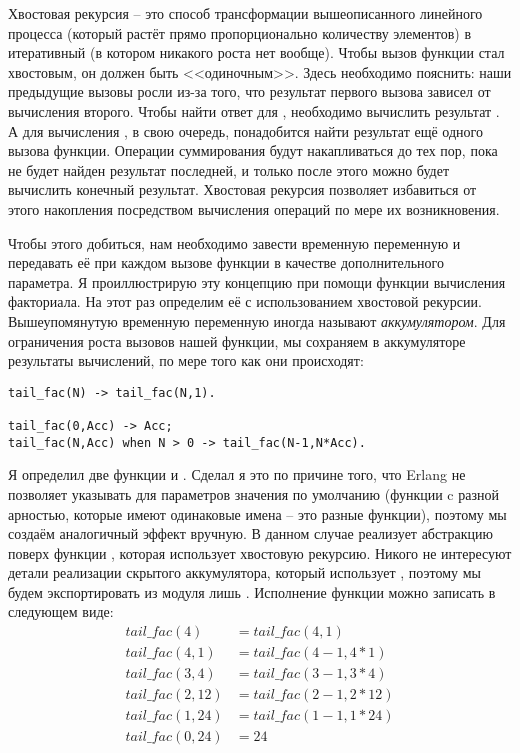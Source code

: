Хвостовая рекурсия \--- это способ трансформации вышеописанного линейного процесса (который растёт прямо пропорционально количеству элементов) в итеративный (в котором никакого роста нет вообще). Чтобы вызов функции стал хвостовым, он должен быть <<одиночным>>. Здесь необходимо пояснить: наши предыдущие вызовы росли из\--за того, что результат первого вызова зависел от вычисления второго. Чтобы найти ответ для , необходимо вычислить результат . А для вычисления , в свою очередь, понадобится найти результат ещё одного вызова функции. Операции суммирования будут накапливаться до тех пор, пока не будет найден результат последней, и только после этого можно будет вычислить конечный результат. Хвостовая рекурсия позволяет избавиться от этого накопления посредством вычисления операций по мере их возникновения.

Чтобы этого добиться, нам необходимо завести временную переменную и передавать её при каждом вызове функции в качестве дополнительного параметра. Я проиллюстрирую эту концепцию при помощи функции вычисления факториала. На этот раз определим её с использованием хвостовой рекурсии. Вышеупомянутую временную переменную иногда называют \emph{аккумулятором}. Для ограничения роста вызовов нашей функции, мы сохраняем в аккумуляторе результаты вычислений, по мере того как они происходят:
\begin{lstlisting}[style=erlang]
tail_fac(N) -> tail_fac(N,1).
 
tail_fac(0,Acc) -> Acc;
tail_fac(N,Acc) when N > 0 -> tail_fac(N-1,N*Acc).
\end{lstlisting}

Я определил две функции  и . Сделал я это по причине того, что Erlang не позволяет указывать для параметров значения по умолчанию (функции c разной арностью, которые имеют одинаковые имена \--- это разные функции), поэтому мы создаём аналогичный эффект вручную. В данном случае  реализует абстракцию поверх функции , которая использует хвостовую рекурсию. Никого не интересуют детали реализации скрытого аккумулятора, который использует , поэтому мы будем экспортировать из модуля лишь . Исполнение функции можно записать в следующем виде:
\begin{align*}
tail\_fac(4) &= tail\_fac(4,1)\\
tail\_fac(4,1) &= tail\_fac(4-1, 4*1)\\
tail\_fac(3,4) &= tail\_fac(3-1, 3*4)\\
tail\_fac(2,12) &= tail\_fac(2-1,2*12)\\
tail\_fac(1,24) &= tail\_fac(1-1, 1*24)\\
tail\_fac(0,24) &= 24
\end{align*}

